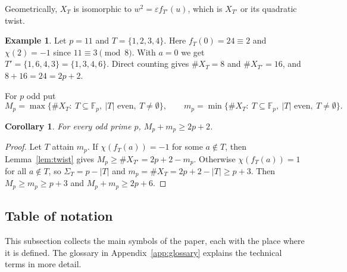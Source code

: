 \documentclass[12pt,letterpaper]{article}
\newtheorem{corollary}[theorem]{Corollary}
\theoremstyle{definition}
\newtheorem{example}[theorem]{Example}
\theoremstyle{remark}
\numberwithin{equation}{section}
\newcommand{\Fp}{\mathbb{F}_p}
\newcommand{\X}{\#X}
\begin{document}
Geometrically, $X_T$ is isomorphic to $w^2=\varepsilon f_{T'}(u)$, which is $X_{T'}$
or its quadratic twist.

\begin{example}\label{ex:twist}
Let $p=11$ and $T=\{1,2,3,4\}$. Here $f_T(0)=24\equiv2$ and $\chi(2)=-1$ since
$11\equiv3\pmod8$. With $a=0$ we get $T'=\{1,6,4,3\}=\{1,3,4,6\}$. Direct counting
gives $\X_T=8$ and $\X_{T'}=16$, and $8+16=24=2p+2$.
\end{example}

For $p$ odd put
\[
M_p=\max\{\X_T:\ T\subseteq\Fp,\ |T|\text{ even},\ T\ne\emptyset\},\qquad
m_p=\min\{\X_T:\ T\subseteq\Fp,\ |T|\text{ even},\ T\ne\emptyset\}.
\]

\begin{corollary}\label{cor:Mm}
For every odd prime $p$, $M_p+m_p\ge 2p+2$.
\end{corollary}

\begin{proof}
Let $T$ attain $m_p$. If $\chi(f_T(a))=-1$ for some $a\notin T$, then
Lemma~\ref{lem:twist} gives $M_p\ge\X_{T'}=2p+2-m_p$. Otherwise
$\chi(f_T(a))=1$ for all $a\notin T$, so $\Sigma_T=p-|T|$ and
$m_p=\X_T=2p+2-|T|\ge p+3$. Then $M_p\ge m_p\ge p+3$ and $M_p+m_p\ge 2p+6$.
\end{proof}

\subsection{Table of notation}

This subsection collects the main symbols of the paper, each with the place where
it is defined. The glossary in Appendix~\ref{app:glossary} explains the technical
terms in more detail.
\end{document}
